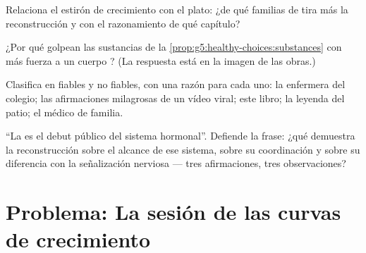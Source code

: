 \begin{exercise}[$\star\star$]\label{exo:g8:puberty:9}
Relaciona el estirón de crecimiento con el plato: ¿de qué familias de
 tira más la reconstrucción y con el razonamiento de qué
capítulo?
\end{exercise}

\begin{exercise}[$\star\star$]\label{exo:g8:puberty:10}
¿Por qué golpean las sustancias de la
\cref{prop:g5:healthy-choices:substances} con más fuerza a un cuerpo
? (La respuesta está en la imagen de las obras.)
\end{exercise}

\begin{exercise}[$\star\star$]\label{exo:g8:puberty:11}
Clasifica en fiables y no fiables, con una razón para cada uno: la
enfermera del colegio; las afirmaciones milagrosas de un vídeo viral;
este libro; la leyenda del patio; el médico de familia.
\end{exercise}

\begin{exercise}[$\star\star\star$]\label{exo:g8:puberty:12}
``La  es el debut público del sistema hormonal''. Defiende la
frase: ¿qué demuestra la reconstrucción sobre el alcance de ese
sistema, sobre su coordinación y sobre su diferencia con la
señalización nerviosa --- tres afirmaciones, tres observaciones?
\end{exercise}

\section{Problema: La sesión de las curvas de crecimiento}

